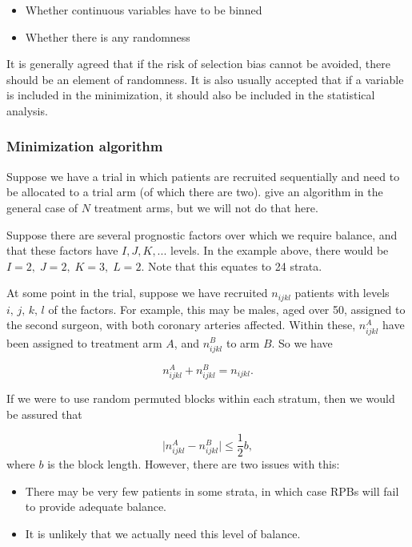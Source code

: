 \documentclass[
  openany]{book}
\providecommand{\tightlist}{%
  \setlength{\itemsep}{0pt}\setlength{\parskip}{0pt}}
\theoremstyle{definition}
\theoremstyle{definition}
\theoremstyle{definition}
\theoremstyle{definition}
\theoremstyle{remark}
\begin{document}
\begin{itemize}
\tightlist
\item
  Whether continuous variables have to be binned
\item
  Whether there is any randomness
\end{itemize}

It is generally agreed that if the risk of selection bias cannot be avoided, there should be an element of randomness. It is also usually accepted that if a variable is included in the minimization, it should also be included in the statistical analysis.

\subsubsection{Minimization algorithm}\label{minimization-algorithm}

Suppose we have a trial in which patients are recruited sequentially and need to be allocated to a trial arm (of which there are two). \citet{pocock1975sequential} give an algorithm in the general case of \(N\) treatment arms, but we will not do that here.

Suppose there are several prognostic factors over which we require balance, and that these factors have \(I, J, K, ...\) levels. In the example above, there would be \(I=2,\; J=2,\; K=3,\; L=2\). Note that this equates to 24 strata.

At some point in the trial, suppose we have recruited \(n_{ijkl}\) patients with levels \(i,\,j,\,k,\,l\) of the factors. For example, this may be males, aged over 50, assigned to the second surgeon, with both coronary arteries affected. Within these, \(n^A_{ijkl}\) have been assigned to treatment arm \(A\), and \(n^B_{ijkl}\) to arm \(B\). So we have

\[ n^A_{ijkl} + n^B_{ijkl} = n_{ijkl} .\]

If we were to use random permuted blocks within each stratum, then we would be assured that

\[\lvert n^A_{ijkl} - n^B_{ijkl} \rvert \leq{\frac{1}{2}b},\]
where \(b\) is the block length. However, there are two issues with this:

\begin{itemize}
\tightlist
\item
  There may be very few patients in some strata, in which case RPBs will fail to provide adequate balance.
\item
  It is unlikely that we actually need this level of balance.
\end{itemize}
\end{document}
